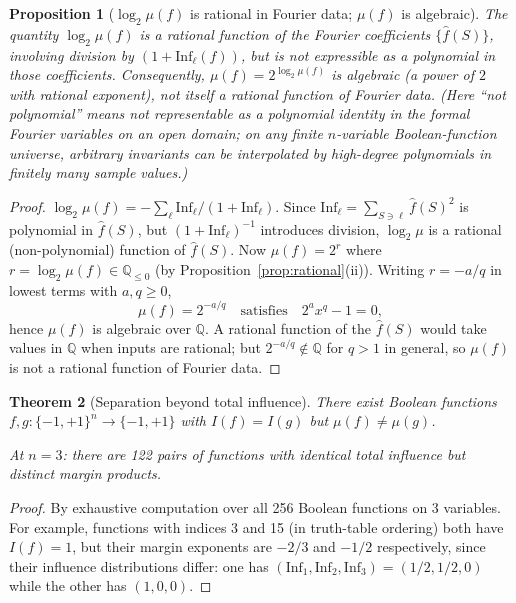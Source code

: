 \documentclass[11pt]{article}
\newtheorem{theorem}{Theorem}[section]
\newtheorem{proposition}[theorem]{Proposition}
\newcommand{\Inf}{\mathrm{Inf}}
\begin{document}
\begin{proposition}[$\log_2\mu(f)$ is rational in Fourier data; $\mu(f)$ is algebraic]
\label{prop:nonpoly}
The quantity $\log_2 \mu(f)$ is a rational function of the Fourier coefficients $\{\hat{f}(S)\}$, involving division by $(1 + \Inf_\ell(f))$, but is not expressible as a polynomial in those coefficients. Consequently, $\mu(f) = 2^{\log_2\mu(f)}$ is \emph{algebraic} (a power of $2$ with rational exponent), not itself a rational function of Fourier data. (Here ``not polynomial'' means not representable as a polynomial identity in the formal Fourier variables on an open domain; on any finite $n$-variable Boolean-function universe, arbitrary invariants can be interpolated by high-degree polynomials in finitely many sample values.)
\end{proposition}

\begin{proof}
$\log_2\mu(f) = -\sum_\ell \Inf_\ell/(1+\Inf_\ell)$. Since $\Inf_\ell = \sum_{S \ni \ell} \hat{f}(S)^2$ is polynomial in $\hat{f}(S)$, but $(1+\Inf_\ell)^{-1}$ introduces division, $\log_2\mu$ is a rational (non-polynomial) function of $\hat{f}(S)$. Now $\mu(f) = 2^{r}$ where $r = \log_2\mu(f) \in \mathbb{Q}_{\le 0}$ (by Proposition~\ref{prop:rational}(ii)). Writing $r = -a/q$ in lowest terms with $a, q \ge 0$,
\[
\mu(f) = 2^{-a/q}
\quad\text{satisfies}\quad
2^a x^q - 1 = 0,
\]
hence $\mu(f)$ is algebraic over $\mathbb{Q}$. A rational function of the $\hat{f}(S)$ would take values in $\mathbb{Q}$ when inputs are rational; but $2^{-a/q} \notin \mathbb{Q}$ for $q > 1$ in general, so $\mu(f)$ is not a rational function of Fourier data.
\end{proof}

\begin{theorem}[Separation beyond total influence]
\label{thm:separation}
There exist Boolean functions $f, g:\{-1,+1\}^n \to \{-1,+1\}$ with $I(f) = I(g)$ but $\mu(f) \neq \mu(g)$.

At $n=3$: there are 122 pairs of functions with identical total influence but distinct margin products.
\end{theorem}

\begin{proof}
By exhaustive computation over all 256 Boolean functions on 3 variables. For example, functions with indices 3 and 15 (in truth-table ordering) both have $I(f) = 1$, but their margin exponents are $-2/3$ and $-1/2$ respectively, since their influence distributions differ: one has $(\Inf_1, \Inf_2, \Inf_3) = (1/2, 1/2, 0)$ while the other has $(1, 0, 0)$.
\end{proof}
\end{document}
